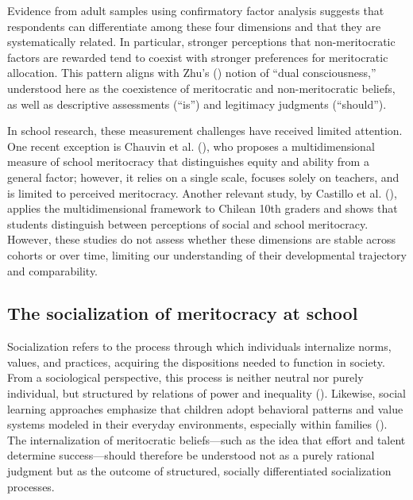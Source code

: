 \documentclass[
  13pt,
]{article}
\begin{document}
Evidence from adult samples using confirmatory factor analysis suggests
that respondents can differentiate among these four dimensions and that
they are systematically related. In particular, stronger perceptions
that non-meritocratic factors are rewarded tend to coexist with stronger
preferences for meritocratic allocation. This pattern aligns with Zhu's
() notion of ``dual
consciousness,'' understood here as the coexistence of meritocratic and
non-meritocratic beliefs, as well as descriptive assessments (``is'')
and legitimacy judgments (``should'').

In school research, these measurement challenges have received limited
attention. One recent exception is Chauvin et al.
(), who proposes a
multidimensional measure of school meritocracy that distinguishes equity
and ability from a general factor; however, it relies on a single scale,
focuses solely on teachers, and is limited to perceived meritocracy.
Another relevant study, by Castillo et al.
(), applies the
multidimensional framework to Chilean 10th graders and shows that
students distinguish between perceptions of social and school
meritocracy. However, these studies do not assess whether these
dimensions are stable across cohorts or over time, limiting our
understanding of their developmental trajectory and comparability.

\subsection{The socialization of meritocracy at
school}\label{the-socialization-of-meritocracy-at-school}

Socialization refers to the process through which individuals
internalize norms, values, and practices, acquiring the dispositions
needed to function in society. From a sociological perspective, this
process is neither neutral nor purely individual, but structured by
relations of power and inequality
(). Likewise, social
learning approaches emphasize that children adopt behavioral patterns
and value systems modeled in their everyday environments, especially
within families (). The internalization of meritocratic beliefs---such as the idea
that effort and talent determine success---should therefore be
understood not as a purely rational judgment but as the outcome of
structured, socially differentiated socialization processes.
\end{document}
